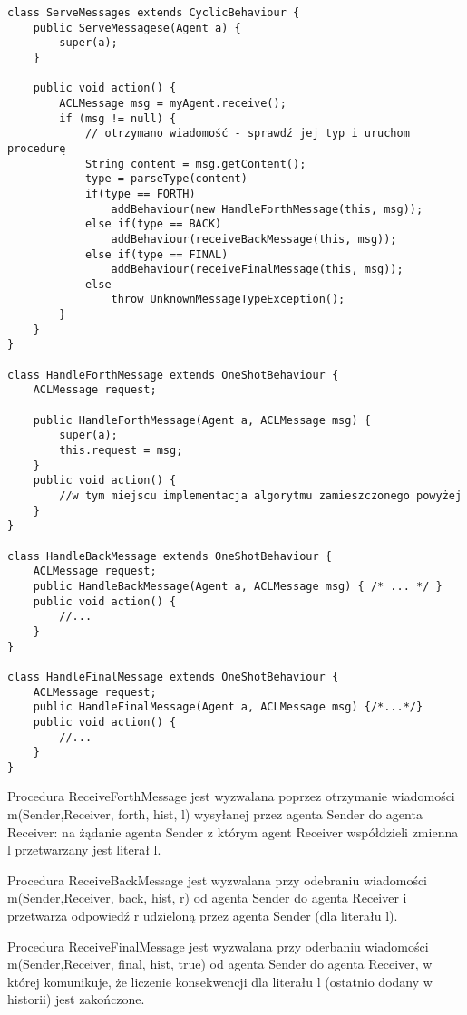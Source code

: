 \documentclass[a4paper,12pt]{mwart}
\begin{document}
\begin{verbatim}
class ServeMessages extends CyclicBehaviour {
    public ServeMessagese(Agent a) {
        super(a);
    }

    public void action() {
        ACLMessage msg = myAgent.receive();
        if (msg != null) {
            // otrzymano wiadomość - sprawdź jej typ i uruchom procedurę
            String content = msg.getContent();
            type = parseType(content)
            if(type == FORTH)
                addBehaviour(new HandleForthMessage(this, msg));
            else if(type == BACK)
                addBehaviour(receiveBackMessage(this, msg));
            else if(type == FINAL)
                addBehaviour(receiveFinalMessage(this, msg));
            else
                throw UnknownMessageTypeException();
        }
    }
}

class HandleForthMessage extends OneShotBehaviour {
    ACLMessage request;

    public HandleForthMessage(Agent a, ACLMessage msg) {
        super(a);
        this.request = msg;
    }
    public void action() {
        //w tym miejscu implementacja algorytmu zamieszczonego powyżej
    }
}

class HandleBackMessage extends OneShotBehaviour {
    ACLMessage request;
    public HandleBackMessage(Agent a, ACLMessage msg) { /* ... */ }
    public void action() {
        //...
    }
}

class HandleFinalMessage extends OneShotBehaviour {
    ACLMessage request;
    public HandleFinalMessage(Agent a, ACLMessage msg) {/*...*/}
    public void action() {
        //...
    }
}

\end{verbatim}

Procedura ReceiveForthMessage jest wyzwalana poprzez otrzymanie wiadomości m(Sender,Receiver, forth, hist, l) wysyłanej przez agenta Sender do agenta Receiver: na żądanie agenta Sender z którym agent Receiver współdzieli zmienna l przetwarzany jest literał l.

Procedura ReceiveBackMessage jest wyzwalana przy odebraniu wiadomości m(Sender,Receiver, back, hist, r) od agenta Sender do agenta Receiver i przetwarza odpowiedź r udzieloną przez agenta Sender (dla literału l).

Procedura ReceiveFinalMessage jest wyzwalana przy oderbaniu wiadomości m(Sender,Receiver, final, hist, true) od agenta Sender do agenta Receiver, w której komunikuje, że liczenie konsekwencji dla literału l (ostatnio dodany w historii) jest zakończone.
\end{document}
